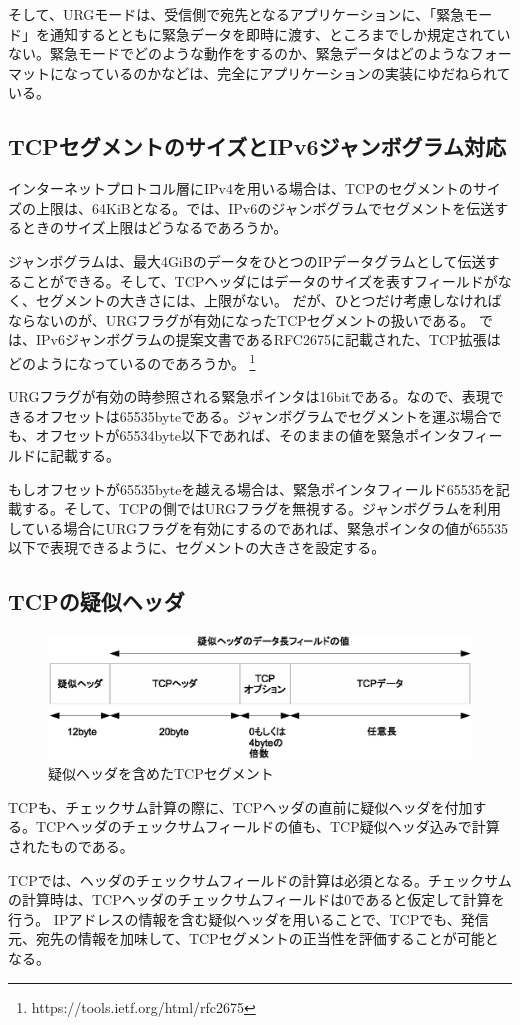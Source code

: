 そして、URGモードは、受信側で宛先となるアプリケーションに、「緊急モード」を通知するとともに緊急データを即時に渡す、ところまでしか規定されていない。緊急モードでどのような動作をするのか、緊急データはどのようなフォーマットになっているのかなどは、完全にアプリケーションの実装にゆだねられている。

\subsection{TCPセグメントのサイズとIPv6ジャンボグラム対応}

インターネットプロトコル層にIPv4を用いる場合は、TCPのセグメントのサイズの上限は、64KiBとなる。では、IPv6のジャンボグラムでセグメントを伝送するときのサイズ上限はどうなるであろうか。

ジャンボグラムは、最大4GiBのデータをひとつのIPデータグラムとして伝送することができる。そして、TCPヘッダにはデータのサイズを表すフィールドがなく、セグメントの大きさには、上限がない。
だが、ひとつだけ考慮しなければならないのが、URGフラグが有効になったTCPセグメントの扱いである。
では、IPv6ジャンボグラムの提案文書であるRFC2675に記載された、TCP拡張はどのようになっているのであろうか。
\footnote{https://tools.ietf.org/html/rfc2675}

URGフラグが有効の時参照される緊急ポインタは16bitである。なので、表現できるオフセットは65535byteである。ジャンボグラムでセグメントを運ぶ場合でも、オフセットが65534byte以下であれば、そのままの値を緊急ポインタフィールドに記載する。

もしオフセットが65535byteを越える場合は、緊急ポインタフィールド65535を記載する。そして、TCPの側ではURGフラグを無視する。ジャンボグラムを利用している場合にURGフラグを有効にするのであれば、緊急ポインタの値が65535以下で表現できるように、セグメントの大きさを設定する。

\subsection{TCPの疑似ヘッダ}

\begin{figure}[htbp]
	\includegraphics[width=12cm,clip]{draw/tcppseudo.eps}
	\caption{疑似ヘッダを含めたTCPセグメント}
	\label{fig:tcppseudo}
\end{figure}

TCPも、チェックサム計算の際に、TCPヘッダの直前に疑似ヘッダを付加する。TCPヘッダのチェックサムフィールドの値も、TCP疑似ヘッダ込みで計算されたものである。

TCPでは、ヘッダのチェックサムフィールドの計算は必須となる。チェックサムの計算時は、TCPヘッダのチェックサムフィールドは0であると仮定して計算を行う。
IPアドレスの情報を含む疑似ヘッダを用いることで、TCPでも、発信元、宛先の情報を加味して、TCPセグメントの正当性を評価することが可能となる。

